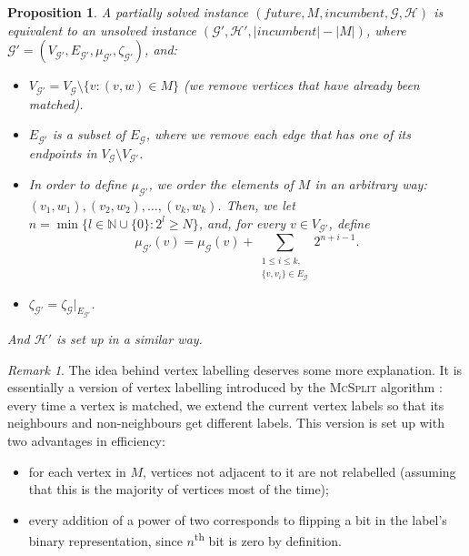 \documentclass{l4proj}
\newtheorem{proposition}{Proposition}[chapter]
\theoremstyle{definition}
\theoremstyle{remark}
\newtheorem{remark}{Remark}[chapter]
\begin{document}
\begin{proposition}
  A partially solved instance $(\textit{future}, M, \textit{incumbent},
  \mathcal{G}, \mathcal{H})$ is equivalent to an unsolved instance
  $(\mathcal{G}', \mathcal{H}', |\textit{incumbent}|-|M|)$, where $\mathcal{G}'
  = (V_{\mathcal{G}'}, E_{\mathcal{G}'}, \mu_{\mathcal{G}'},
  \zeta_{\mathcal{G}'})$, and:
\begin{itemize}
\item $V_{\mathcal{G}'} = V_{\mathcal{G}} \setminus \{ v : (v, w) \in M \}$ (we
  remove vertices that have already been matched).
\item $E_{\mathcal{G}'}$ is a subset of $E_{\mathcal{G}}$, where we remove each
  edge that has one of its endpoints in $V_{\mathcal{G}} \setminus
  V_{\mathcal{G}'}$.
\item In order to define $\mu_{\mathcal{G}'}$, we order the elements of $M$ in
  an arbitrary way: $(v_1, w_1), (v_2, w_2), \dots, (v_k, w_k)$. Then, we let $n
  = \min \{ l \in \mathbb{N} \cup \{ 0 \} : 2^l \ge N \}$, and, for every $v \in
  V_{\mathcal{G}'}$, define
\[\mu_{\mathcal{G}'}(v) = \mu_{\mathcal{G}}(v) + \sum_{\substack{1 \le i \le
      k,\\\{ v, v_i \} \in E_{\mathcal{G}}}} 2^{n+i-1}. \]
\item $\zeta_{\mathcal{G}'} = \zeta_{\mathcal{G}}|_{E_{\mathcal{G'}}}$.
\end{itemize}
And $\mathcal{H}'$ is set up in a similar way.
\end{proposition}

\begin{remark}
  The idea behind vertex labelling deserves some more explanation. It is
  essentially a version of vertex labelling introduced by the \textsc{McSplit}
  algorithm \cite{DBLP:conf/ijcai/McCreeshPT17}: every time a vertex is matched,
  we extend the current vertex labels so that its neighbours and non-neighbours
  get different labels. This version is set up with two advantages in
  efficiency:
  \begin{itemize}
  \item for each vertex in $M$, vertices not adjacent to it are not relabelled
    (assuming that this is the majority of vertices most of the time);
  \item every addition of a power of two corresponds to flipping a bit in the
    label's binary representation, since $n$\textsuperscript{th} bit is zero by
    definition.
  \end{itemize}
\end{remark}
\end{document}
